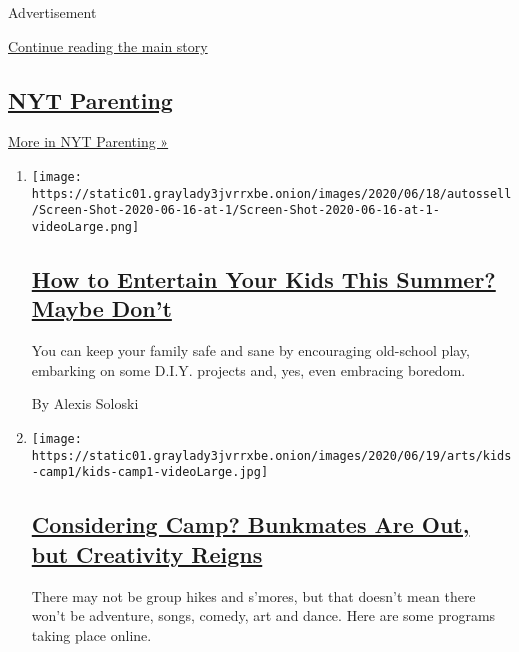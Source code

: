Advertisement

\protect\hyperlink{after-mid1}{Continue reading the main story}

\hypertarget{nyt-parenting}{%
\subsection{\texorpdfstring{\href{/spotlight/parenting}{NYT
Parenting}}{NYT Parenting}}\label{nyt-parenting}}

\href{/spotlight/parenting}{More in NYT Parenting »}

\begin{enumerate}
\def\labelenumi{\arabic{enumi}.}
\item
  \texttt{[image: https://static01.graylady3jvrrxbe.onion/images/2020/06/18/autossell/Screen-Shot-2020-06-16-at-1/Screen-Shot-2020-06-16-at-1-videoLarge.png]}

  \hypertarget{how-to-entertain-your-kids-this-summer-maybe-dont}{%
  \subsection{\texorpdfstring{\href{/2020/06/18/arts/kids-summer-activities-virus.html}{How
  to Entertain Your Kids This Summer? Maybe
  Don't}}{How to Entertain Your Kids This Summer? Maybe Don't}}\label{how-to-entertain-your-kids-this-summer-maybe-dont}}

  You can keep your family safe and sane by encouraging old-school play,
  embarking on some D.I.Y. projects and, yes, even embracing boredom.

  By Alexis Soloski
\item
  \texttt{[image: https://static01.graylady3jvrrxbe.onion/images/2020/06/19/arts/kids-camp1/kids-camp1-videoLarge.jpg]}

  \hypertarget{considering-camp-bunkmates-are-out-but-creativity-reigns}{%
  \subsection{\texorpdfstring{\href{/2020/06/18/arts/kids-summer-camps-virtual.html}{Considering
  Camp? Bunkmates Are Out, but Creativity
  Reigns}}{Considering Camp? Bunkmates Are Out, but Creativity Reigns}}\label{considering-camp-bunkmates-are-out-but-creativity-reigns}}

  There may not be group hikes and s'mores, but that doesn't mean there
  won't be adventure, songs, comedy, art and dance. Here are some
  programs taking place online.


\end{enumerate}
